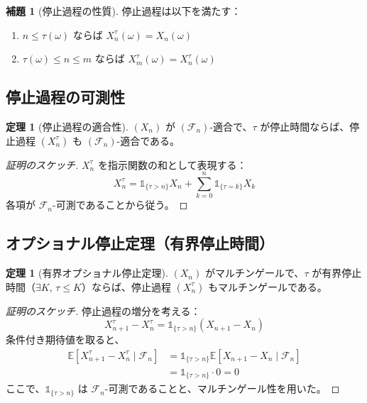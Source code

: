 \documentclass[a4paper,12pt]{article}
\theoremstyle{definition}
\newtheorem{theorem}[definition]{定理}
\newtheorem{lemma}[definition]{補題}
\begin{document}
\begin{lemma}[停止過程の性質]
停止過程は以下を満たす：
\begin{enumerate}
\item $n \leq \tau(\omega)$ ならば $X^\tau_n(\omega) = X_n(\omega)$
\item $\tau(\omega) \leq n \leq m$ ならば $X^\tau_m(\omega) = X^\tau_n(\omega)$
\end{enumerate}
\end{lemma}

\subsection{停止過程の可測性}

\begin{theorem}[停止過程の適合性]
$(X_n)$ が $(\mathcal{F}_n)$-適合で、$\tau$ が停止時間ならば、停止過程 $(X^\tau_n)$ も $(\mathcal{F}_n)$-適合である。
\end{theorem}

\begin{proof}[証明のスケッチ]
$X^\tau_n$ を指示関数の和として表現する：
\[
X^\tau_n = \mathbb{1}_{\{\tau > n\}} X_n + \sum_{k=0}^n \mathbb{1}_{\{\tau = k\}} X_k
\]
各項が $\mathcal{F}_n$-可測であることから従う。
\end{proof}

\subsection{オプショナル停止定理（有界停止時間）}

\begin{theorem}[有界オプショナル停止定理]\label{thm:optional-stopping-bounded}
$(X_n)$ がマルチンゲールで、$\tau$ が有界停止時間（$\exists K, \, \tau \leq K$）ならば、停止過程 $(X^\tau_n)$ もマルチンゲールである。
\end{theorem}

\begin{proof}[証明のスケッチ]
停止過程の増分を考える：
\[
X^\tau_{n+1} - X^\tau_n = \mathbb{1}_{\{\tau > n\}} (X_{n+1} - X_n)
\]
条件付き期待値を取ると、
\begin{align*}
\mathbb{E}[X^\tau_{n+1} - X^\tau_n \mid \mathcal{F}_n] &= \mathbb{1}_{\{\tau > n\}} \mathbb{E}[X_{n+1} - X_n \mid \mathcal{F}_n] \\
&= \mathbb{1}_{\{\tau > n\}} \cdot 0 = 0
\end{align*}
ここで、$\mathbb{1}_{\{\tau > n\}}$ は $\mathcal{F}_n$-可測であることと、マルチンゲール性を用いた。
\end{proof}
\end{document}
